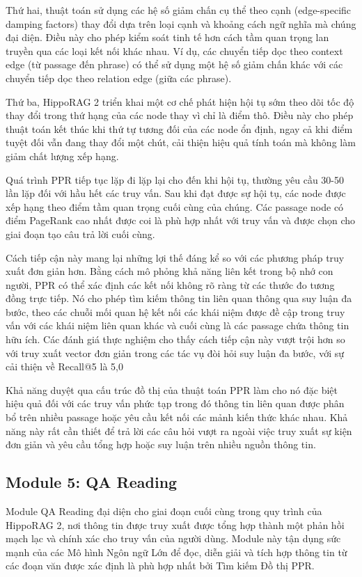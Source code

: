 \documentclass[../main.tex]{subfiles}
\begin{document}
Thứ hai, thuật toán sử dụng các hệ số giảm chấn cụ thể theo cạnh (edge-specific damping factors) thay đổi dựa trên loại cạnh và khoảng cách ngữ nghĩa mà chúng đại diện. Điều này cho phép kiểm soát tinh tế hơn cách tầm quan trọng lan truyền qua các loại kết nối khác nhau. Ví dụ, các chuyển tiếp dọc theo context edge (từ passage đến phrase) có thể sử dụng một hệ số giảm chấn khác với các chuyển tiếp dọc theo relation edge (giữa các phrase).

Thứ ba, HippoRAG 2 triển khai một cơ chế phát hiện hội tụ sớm theo dõi tốc độ thay đổi trong thứ hạng của các node thay vì chỉ là điểm thô. Điều này cho phép thuật toán kết thúc khi thứ tự tương đối của các node ổn định, ngay cả khi điểm tuyệt đối vẫn đang thay đổi một chút, cải thiện hiệu quả tính toán mà không làm giảm chất lượng xếp hạng.

Quá trình PPR tiếp tục lặp đi lặp lại cho đến khi hội tụ, thường yêu cầu 30-50 lần lặp đối với hầu hết các truy vấn. Sau khi đạt được sự hội tụ, các node được xếp hạng theo điểm tầm quan trọng cuối cùng của chúng. Các passage node có điểm PageRank cao nhất được coi là phù hợp nhất với truy vấn và được chọn cho giai đoạn tạo câu trả lời cuối cùng.

Cách tiếp cận này mang lại những lợi thế đáng kể so với các phương pháp truy xuất đơn giản hơn. Bằng cách mô phỏng khả năng liên kết trong bộ nhớ con người, PPR có thể xác định các kết nối không rõ ràng từ các thước đo tương đồng trực tiếp. Nó cho phép tìm kiếm thông tin liên quan thông qua suy luận đa bước, theo các chuỗi mối quan hệ kết nối các khái niệm được đề cập trong truy vấn với các khái niệm liên quan khác và cuối cùng là các passage chứa thông tin hữu ích. Các đánh giá thực nghiệm cho thấy cách tiếp cận này vượt trội hơn so với truy xuất vector đơn giản trong các tác vụ đòi hỏi suy luận đa bước, với sự cải thiện về Recall@5 là 5,0%

Khả năng duyệt qua cấu trúc đồ thị của thuật toán PPR làm cho nó đặc biệt hiệu quả đối với các truy vấn phức tạp trong đó thông tin liên quan được phân bổ trên nhiều passage hoặc yêu cầu kết nối các mảnh kiến thức khác nhau. Khả năng này rất cần thiết để trả lời các câu hỏi vượt ra ngoài việc truy xuất sự kiện đơn giản và yêu cầu tổng hợp hoặc suy luận trên nhiều nguồn thông tin.

\subsection{Module 5: QA Reading}
Module QA Reading đại diện cho giai đoạn cuối cùng trong quy trình của HippoRAG 2, nơi thông tin được truy xuất được tổng hợp thành một phản hồi mạch lạc và chính xác cho truy vấn của người dùng. Module này tận dụng sức mạnh của các Mô hình Ngôn ngữ Lớn để đọc, diễn giải và tích hợp thông tin từ các đoạn văn được xác định là phù hợp nhất bởi Tìm kiếm Đồ thị PPR.
\end{document}

